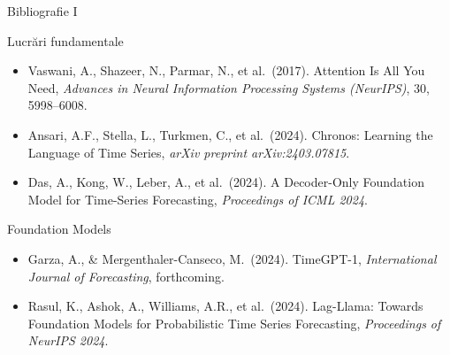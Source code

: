 \documentclass[9pt, aspectratio=169, t]{beamer}
\begin{document}
\begin{frame}{Bibliografie I}
    \begin{block}{Lucrări fundamentale}
        {\footnotesize
        \begin{itemize}\setlength{\itemsep}{0pt}
            \item Vaswani, A., Shazeer, N., Parmar, N., et al.\ (2017). Attention Is All You Need, \textit{Advances in Neural Information Processing Systems (NeurIPS)}, 30, 5998--6008.
            \item Ansari, A.F., Stella, L., Turkmen, C., et al.\ (2024). Chronos: Learning the Language of Time Series, \textit{arXiv preprint arXiv:2403.07815}.
            \item Das, A., Kong, W., Leber, A., et al.\ (2024). A Decoder-Only Foundation Model for Time-Series Forecasting, \textit{Proceedings of ICML 2024}.
        \end{itemize}
        }
    \end{block}

    \begin{exampleblock}{Foundation Models}
        {\footnotesize
        \begin{itemize}\setlength{\itemsep}{0pt}
            \item Garza, A., \& Mergenthaler-Canseco, M.\ (2024). TimeGPT-1, \textit{International Journal of Forecasting}, forthcoming.
            \item Rasul, K., Ashok, A., Williams, A.R., et al.\ (2024). Lag-Llama: Towards Foundation Models for Probabilistic Time Series Forecasting, \textit{Proceedings of NeurIPS 2024}.
        \end{itemize}
        }
    \end{exampleblock}
\end{frame}
\end{document}
